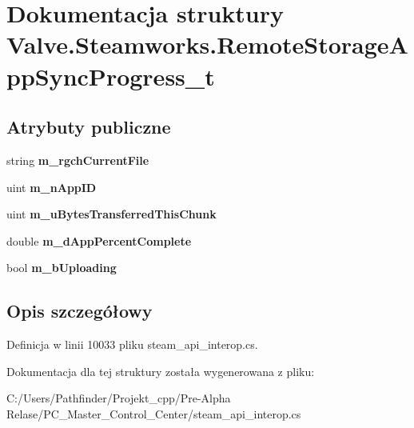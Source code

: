 \hypertarget{struct_valve_1_1_steamworks_1_1_remote_storage_app_sync_progress__t}{}\section{Dokumentacja struktury Valve.\+Steamworks.\+Remote\+Storage\+App\+Sync\+Progress\+\_\+t}
\label{struct_valve_1_1_steamworks_1_1_remote_storage_app_sync_progress__t}
\subsection*{Atrybuty publiczne}
\begin{DoxyCompactItemize}
\item 
\mbox{\label{struct_valve_1_1_steamworks_1_1_remote_storage_app_sync_progress__t_a5570d12ab697ac240b821326b26b479b}} 
string {\bfseries m\+\_\+rgch\+Current\+File}
\item 
\mbox{\label{struct_valve_1_1_steamworks_1_1_remote_storage_app_sync_progress__t_a34cca55a60b566b8a0fc6a47cf06caf5}} 
uint {\bfseries m\+\_\+n\+App\+ID}
\item 
\mbox{\label{struct_valve_1_1_steamworks_1_1_remote_storage_app_sync_progress__t_abdf4bff436e7a400b95abadfa5916a98}} 
uint {\bfseries m\+\_\+u\+Bytes\+Transferred\+This\+Chunk}
\item 
\mbox{\label{struct_valve_1_1_steamworks_1_1_remote_storage_app_sync_progress__t_a896e63b2489f22998863f087a1fc1a42}} 
double {\bfseries m\+\_\+d\+App\+Percent\+Complete}
\item 
\mbox{\label{struct_valve_1_1_steamworks_1_1_remote_storage_app_sync_progress__t_a720022c818c5eea535b2a770a362176a}} 
bool {\bfseries m\+\_\+b\+Uploading}
\end{DoxyCompactItemize}


\subsection{Opis szczegółowy}


Definicja w linii 10033 pliku steam\+\_\+api\+\_\+interop.\+cs.



Dokumentacja dla tej struktury została wygenerowana z pliku\+:\begin{DoxyCompactItemize}
\item 
C\+:/\+Users/\+Pathfinder/\+Projekt\+\_\+cpp/\+Pre-\/\+Alpha Relase/\+P\+C\+\_\+\+Master\+\_\+\+Control\+\_\+\+Center/steam\+\_\+api\+\_\+interop.\+cs\end{DoxyCompactItemize}
